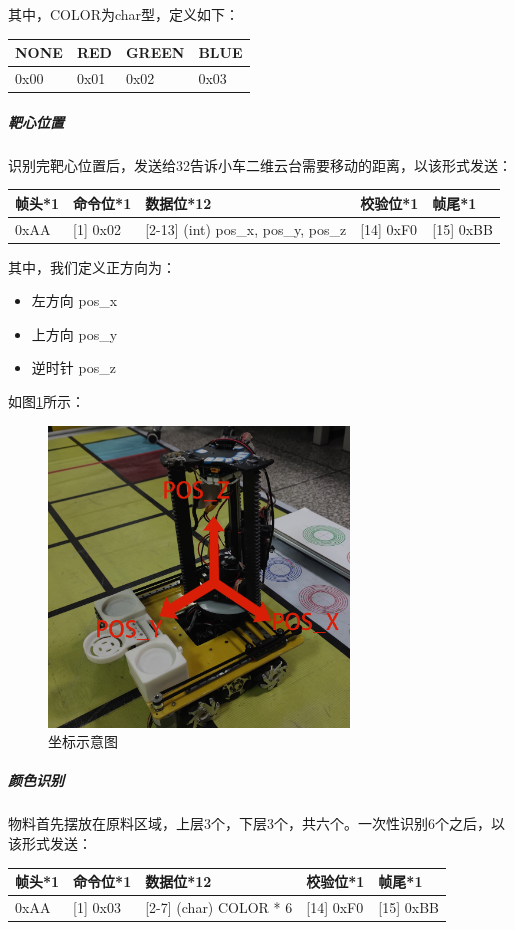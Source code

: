 \documentclass[a4paper,11pt,UTF8]{ctexart}
\begin{document}
其中，COLOR为char型，定义如下：

\begin{table}[!ht]
  \begin{tabular}{|l|l|l|l|}
  \hline
      NONE & RED & GREEN & BLUE \\ \hline
      0x00 & 0x01 & 0x02 & 0x03 \\ \hline
  \end{tabular}
\end{table}

\subparagraph{靶心位置}
识别完靶心位置后，发送给32告诉小车二维云台需要移动的距离，以该形式发送：

\begin{table}[htbp]
  \begin{tabular}{|l|l|l|l|l|}
  \hline
      帧头*1 & 命令位*1 & 数据位*12 & 校验位*1 & 帧尾*1 \\ \hline
      [0] 0xAA & [1] 0x02 & [2-13] (int) pos\_x, pos\_y, pos\_z & [14] 0xF0 & [15] 0xBB \\ \hline
  \end{tabular}
\end{table}

其中，我们定义正方向为：
\begin{itemize}
  \item 左方向 pos\_x
  \item 上方向 pos\_y
  \item 逆时针 pos\_z
\end{itemize}
如图\ref{fig_car_pos}所示：
\begin{figure}[htbp]
  \centering
  \includegraphics[width=8cm]{car_pos.jpg}
  \caption{坐标示意图} \label{fig_car_pos}
\end{figure}

\subparagraph{颜色识别}
物料首先摆放在原料区域，上层3个，下层3个，共六个。一次性识别6个之后，以该形式发送：
\begin{table}[!ht]
  \begin{tabular}{|l|l|l|l|l|}
  \hline
      帧头*1 & 命令位*1 & 数据位*12 & 校验位*1 & 帧尾*1 \\ \hline
      [0] 0xAA & [1] 0x03 & [2-7] (char) COLOR * 6 & [14] 0xF0 & [15] 0xBB \\ \hline
  \end{tabular}
\end{table}
\end{document}
